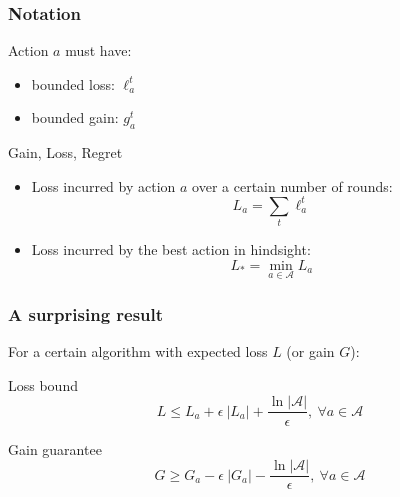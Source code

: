 \documentclass{beamer}
\begin{document}
\begin{frame}
    \frametitle{Notation}

    \begin{block}{Action $a$ must have:}
        \begin{itemize}
            \item bounded loss: $\ell_a^t$
            \item bounded gain: $g_a^t$
        \end{itemize}
    \end{block}

    \begin{block}{Gain, Loss, Regret}
        \begin{itemize}
            \item Loss incurred by action $a$ over a certain number of rounds:
                \begin{equation*}
                    L_a = \sum_t \ell_a^t
                \end{equation*}
            \item Loss incurred by the best action in hindsight:
                \begin{equation*}
                    L_* = \min_{a\in\mathcal{A}} L_a
                \end{equation*}
        \end{itemize}
    \end{block}

\end{frame}

\begin{frame}
    \frametitle{A surprising result}

    For a certain algorithm with expected loss $L$ (or gain $G$):

    \begin{block}{Loss bound}
        \begin{equation*}
            L \leq L_a + \epsilon~|L_a| + \dfrac{\ln|\mathcal{A}|}{\epsilon},
            ~\forall a\in \mathcal{A}
        \end{equation*}
    \end{block}

    \begin{block}{Gain guarantee}
        \begin{equation*}
            G \geq G_a - \epsilon~|G_a| - \dfrac{\ln |\mathcal{A}|}{\epsilon},
            ~\forall a\in \mathcal{A}
        \end{equation*}
    \end{block}

\end{frame}
\end{document}

